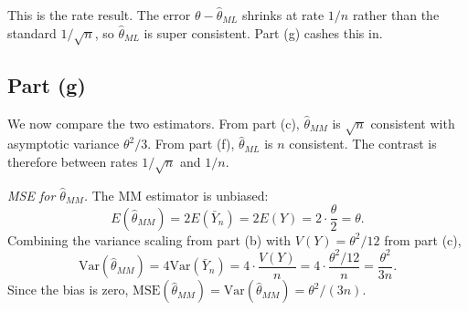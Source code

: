 This is the rate result. The error $\theta - \widehat\theta_{ML}$ shrinks at rate $1/n$ rather than the standard $1/\sqrt n$, so $\widehat\theta_{ML}$ is super consistent. Part (g) cashes this in.

\subsection*{Part (g)}

We now compare the two estimators. From part (c), $\widehat\theta_{MM}$ is $\sqrt n$ consistent with asymptotic variance $\theta^2/3$. From part (f), $\widehat\theta_{ML}$ is $n$ consistent. The contrast is therefore between rates $1/\sqrt n$ and $1/n$.

\textit{MSE for $\widehat\theta_{MM}$.} The MM estimator is unbiased:
\[
E(\widehat\theta_{MM}) = 2 E(\bar Y_n) = 2 E(Y) = 2 \cdot \frac{\theta}{2} = \theta.
\]
Combining the variance scaling from part (b) with $V(Y) = \theta^2/12$ from part (c),
\[
\mathrm{Var}(\widehat\theta_{MM}) = 4 \mathrm{Var}(\bar Y_n) = 4 \cdot \frac{V(Y)}{n} = 4 \cdot \frac{\theta^2/12}{n} = \frac{\theta^2}{3 n}.
\]
Since the bias is zero, $\mathrm{MSE}(\widehat\theta_{MM}) = \mathrm{Var}(\widehat\theta_{MM}) = \theta^2/(3 n)$.

